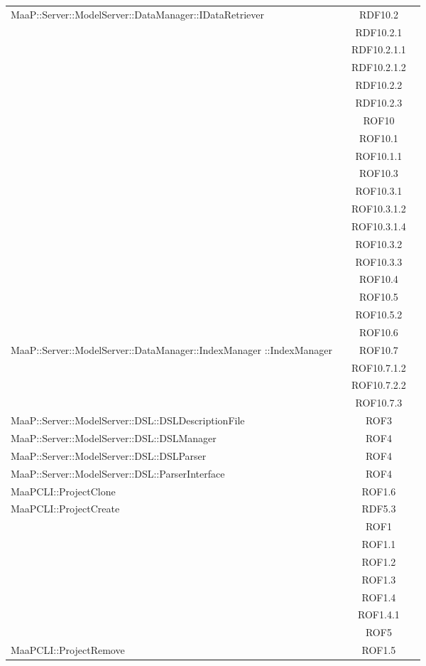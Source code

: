 \begin{center}
\begin{longtable}{|p{0.8\linewidth}|c|}
\midrule
MaaP::Server::ModelServer::DataManager::IDataRetriever
& RDF10.2\\
& RDF10.2.1\\
& RDF10.2.1.1\\
& RDF10.2.1.2\\
& RDF10.2.2\\
& RDF10.2.3\\
& ROF10\\
& ROF10.1\\
& ROF10.1.1\\
& ROF10.3\\
& ROF10.3.1\\
& ROF10.3.1.2\\
& ROF10.3.1.4\\
& ROF10.3.2\\
& ROF10.3.3\\
& ROF10.4\\
& ROF10.5\\
& ROF10.5.2\\
& ROF10.6\\

\midrule
MaaP::Server::ModelServer::DataManager::IndexManager ::IndexManager
& ROF10.7\\
& ROF10.7.1.2\\
& ROF10.7.2.2\\
& ROF10.7.3\\

\midrule
MaaP::Server::ModelServer::DSL::DSLDescriptionFile
& ROF3\\

\midrule
MaaP::Server::ModelServer::DSL::DSLManager
& ROF4\\

\midrule
MaaP::Server::ModelServer::DSL::DSLParser
& ROF4\\

\midrule
MaaP::Server::ModelServer::DSL::ParserInterface
& ROF4\\

\midrule
MaaPCLI::ProjectClone
& ROF1.6\\

\midrule
MaaPCLI::ProjectCreate
& RDF5.3\\
& ROF1\\
& ROF1.1\\
& ROF1.2\\
& ROF1.3\\
& ROF1.4\\
& ROF1.4.1\\
& ROF5\\

\midrule
MaaPCLI::ProjectRemove
& ROF1.5\\

\end{longtable}
\end{center}

